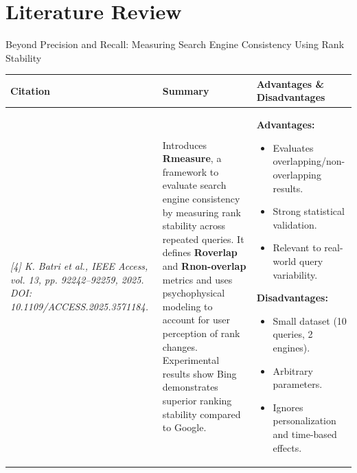 \section{Literature Review}
\begin{frame}{Beyond Precision and Recall: Measuring Search Engine Consistency Using Rank Stability}
    \scriptsize
    \vspace{-0.8em}
    
    \begin{table}[h!]
    \centering
    \renewcommand{\arraystretch}{1.5} %
    \setlength{\tabcolsep}{2.5pt}     %
    
    \begin{tabular}{|p{2.6cm}|p{4.3cm}|p{4.3cm}|}
    \hline
    \textbf{Citation} & \textbf{Summary} & \textbf{Advantages \& Disadvantages} \\
    \hline
    \tiny\textit{[4] K. Batri \textit{et al.}, IEEE Access, vol. 13, pp. 92242–92259, 2025.  
    DOI: 10.1109/ACCESS.2025.3571184.}
    &
    Introduces \textbf{Rmeasure}, a framework to evaluate search engine consistency by measuring rank stability across repeated queries. It defines \textbf{Roverlap} and \textbf{Rnon-overlap} metrics and uses psychophysical modeling to account for user perception of rank changes. Experimental results show Bing demonstrates superior ranking stability compared to Google.
    &
    \textbf{Advantages:}
    \begin{itemize}\itemsep0.25em
    \item Evaluates overlapping/non-overlapping results.
    \item Strong statistical validation.
    \item Relevant to real-world query variability.
    \end{itemize}
    
    \textbf{Disadvantages:}
    \begin{itemize}\itemsep0.25em
    \item Small dataset (10 queries, 2 engines).
    \item Arbitrary parameters.
    \item Ignores personalization and time-based effects.
    \end{itemize} \\
    \hline
    \end{tabular}
    \end{table} 
\end{frame}